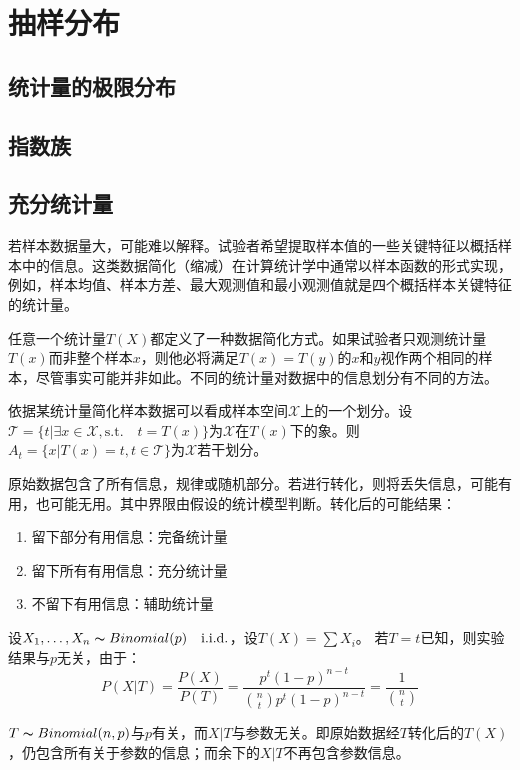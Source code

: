 \chapter{抽样分布}

\section{统计量的极限分布}

\section{指数族}

\section{充分统计量}

若样本数据量大，可能难以解释。试验者希望提取样本值的一些关键特征以概括样本中的信息。这类数据简化（缩减）在计算统计学中通常以样本函数的形式实现，例如，样本均值、样本方差、最大观测值和最小观测值就是四个概括样本关键特征的统计量。

任意一个统计量$T(X)$都定义了一种数据简化方式。如果试验者只观测统计量$T(x)$而非整个样本$x$，则他必将满足$T(x) = T(y)$的$x$和$y$视作两个相同的样本，尽管事实可能并非如此。不同的统计量对数据中的信息划分有不同的方法。

依据某统计量简化样本数据可以看成样本空间$\mathcal{X}$上的一个划分。设$\mathcal{T}=\{t|\exists x \in \mathcal{X}, \text{s.t.} \quad  t=T(x) \}$为$\mathcal{X}$在$T(x)$下的象。则$A_t=\{x|T(x)=t, t \in \mathcal{T}\}$为$\mathcal{X}$若干划分。

原始数据包含了所有信息，规律或随机部分。若进行转化，则将丢失信息，可能有用，也可能无用。其中界限由假设的统计模型判断。转化后的可能结果：
\begin{enumerate}
	\item 留下部分有用信息：完备统计量
	\item 留下所有有用信息：充分统计量
	\item 不留下有用信息：辅助统计量
\end{enumerate}

\begin{example}
	设$X_1,\dots,X_n \thicksim Binomial(p) \quad \text{i.i.d.} $，设$T(X)=\sum X_i$。
	若$T=t$已知，则实验结果与$p$无关，由于：
	$$P(X|T)=\frac{P(X)}{P(T)}=\frac{p^t(1-p)^{n-t}}{\binom{n}{t} p^t(1-p)^{n-t}}=\frac{1}{\binom{n}{t}}$$
\end{example}

\begin{remark}
	$T \thicksim Binomial(n,p)$与$p$有关，而$X|T$与参数无关。即原始数据经$T$转化后的$T(X)$，仍包含所有关于参数的信息；而余下的$X|T$不再包含参数信息。
\end{remark}

